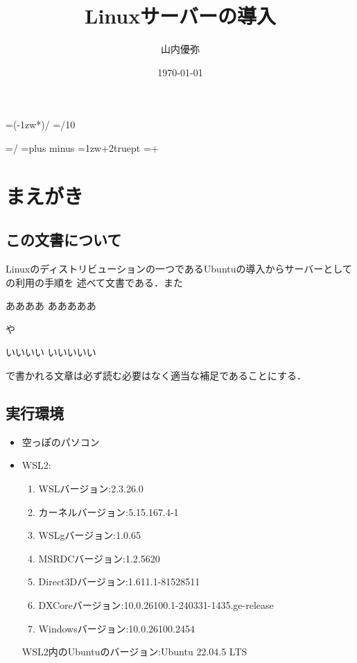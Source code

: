 \documentclass[dvipdfmx,a4paper,11pt]{jsbook}
\begin{document}
\setlength{\footskip}{20truemm}

\makeatletter
\newcount\@chars\newcount\@lines
{}                      %

\newdimen\@kanjiskip
\@kanjiskip=\dimexpr(\textwidth-1zw*\@chars)/\numexpr{}
\newdimen\@@kanjiskip
\@@kanjiskip=\dimexpr\@kanjiskip/10

\baselineskip=\dimexpr\textheight/\@lines
\kanjiskip=\@kanjiskip plus \@@kanjiskip minus \@@kanjiskip
\parindent=\dimexpr 1zw+2truept
\parindent=\dimexpr\parindent+\@kanjiskip
\makeatother


\title{Linuxサーバーの導入}
\author{山内優弥}
\date{\today}
\maketitle

\setcounter{tocdepth}{2}

\tableofcontents
\clearpage

\chapter{まえがき}

\section{この文書について}
Linuxのディストリビューションの一つであるUbuntuの導入からサーバーとしての利用の手順を
述べて文書である．また
\begin{mainbox}{ああああ}
  あああああ
\end{mainbox}
や
\begin{subbox}{いいいい}
  いいいいい
\end{subbox}
で書かれる文章は必ず読む必要はなく適当な補足であることにする．
\section{実行環境} 
\begin{itemize}
  \item 空っぽのパソコン
  \item WSL2:
  \begin{enumerate}
    \item[] WSLバージョン:2.3.26.0
    \item[] カーネルバージョン:5.15.167.4-1
    \item[] WSLgバージョン:1.0.65
    \item[] MSRDCバージョン:1.2.5620
    \item[] Direct3Dバージョン:1.611.1-81528511
    \item[] DXCoreバージョン:10.0.26100.1-240331-1435.ge-release
    \item[] Windowsバージョン:10.0.26100.2454
  \end{enumerate}
  WSL2内のUbuntuのバージョン:Ubuntu 22.04.5 LTS
\end{itemize}
\end{document}
